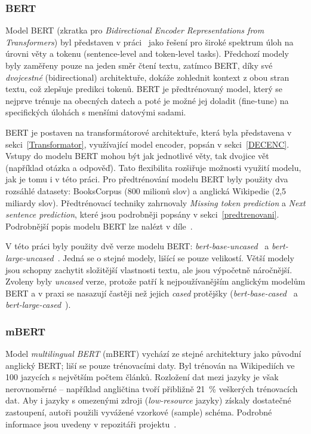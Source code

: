 \subsubsection{BERT}
Model BERT (zkratka pro \emph{Bidirectional Encoder Representations from Transformers}) byl představen v práci~\cite{devlin2019bert} jako řešení pro široké spektrum úloh na úrovni věty a tokenu (sentence-level and token-level tasks). Předchozí modely byly zaměřeny pouze na jeden směr čtení textu, zatímco BERT, díky své \emph{dvojcestné} (bidirectional) architektuře, dokáže zohlednit kontext z obou stran textu, což zlepšuje predikci tokenů. BERT je předtrénovaný model, který se nejprve trénuje na obecných datech a poté je možné jej doladit (fine-tune) na specifických úlohách s menšími datovými sadami.

BERT je postaven na transformátorové architektuře, která byla představena v sekci~\ref{Transformator}, využívající model encoder, popsán v sekci~\ref{DECENC}. Vstupy do modelu BERT mohou být jak jednotlivé věty, tak dvojice vět (například otázka a odpověď). Tato flexibilita rozšiřuje možnosti využití modelu, jak je tomu i v této práci. Pro předtrénování modelu BERT byly použity dva rozsáhlé datasety: BooksCorpus (800 milionů slov) a anglická Wikipedie (2,5 miliardy slov). Předtrénovací techniky zahrnovaly \emph{Missing token prediction} a \emph{Next sentence prediction}, které jsou podrobněji popsány v sekci~\ref{predtrenovani}. Podrobnější popis modelu BERT lze nalézt v díle~\cite{devlin2019bert}.

V této práci byly použity dvě verze modelu BERT: \emph{bert-base-uncased}~\cite{BERTbaseuncased} a \emph{bert-large-uncased}~\cite{BERTlargeuncased}. Jedná se o stejné modely, lišící se pouze velikostí. Větší modely jsou schopny zachytit složitější vlastnosti textu, ale jsou výpočetně náročnější.~\cite{devlin2019bert} Zvoleny byly \emph{uncased} verze, protože patří k nejpoužívanějším anglickým modelům BERT a v praxi se nasazují častěji než jejich \emph{cased} protějšky (\emph{bert-base-cased}~\cite{BERTbasecased} a \emph{bert-large-cased}~\cite{BERTlargecased}).

\subsubsection{mBERT}
Model \emph{multilingual BERT} (mBERT) vychází ze stejné architektury jako původní anglický BERT; liší se pouze trénovacími daty. Byl trénován na Wikipediích ve 100 jazycích s největším počtem článků. Rozložení dat mezi jazyky je však nerovnoměrné -- například angličtina tvoří přibližně 21~\% veškerých trénovacích dat. Aby i jazyky s omezenými zdroji (\emph{low-resource} jazyky) získaly dostatečné zastoupení, autoři použili vyvážené vzorkové (sample) schéma. Podrobné informace jsou uvedeny v repozitáři projektu~\cite{GoogleResearchGitHubMulti}.


